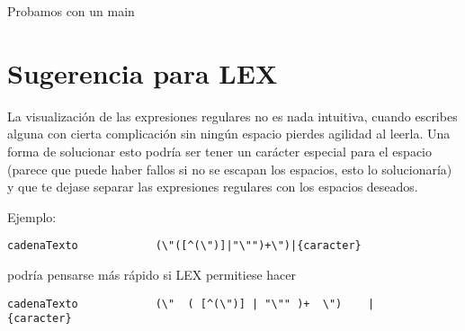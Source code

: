 \documentclass[11pt,spanish]{article} %
\begin{document}



Probamos con un main






\section{Sugerencia para LEX}
La visualización de las expresiones regulares no es nada intuitiva, cuando escribes alguna con cierta complicación sin ningún espacio pierdes agilidad al leerla.
Una forma de solucionar esto podría ser tener un carácter especial para el espacio (parece que puede haber fallos si no se escapan los espacios, esto lo solucionaría) y que te dejase separar las expresiones regulares con los espacios deseados.

Ejemplo:
\begin{lstlisting}
cadenaTexto            (\"([^(\")]|"\"")+\")|{caracter}
\end{lstlisting}
podría pensarse más rápido si LEX permitiese hacer
\begin{lstlisting}
cadenaTexto            (\"  ( [^(\")] | "\"" )+  \")    |    {caracter} 
\end{lstlisting}


\end{document}
